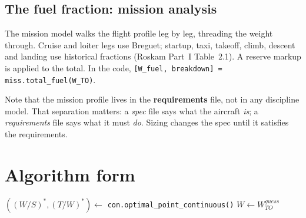 \documentclass[11pt, a4paper]{article}
\begin{document}
\subsection{The fuel fraction: mission analysis}

The mission model walks the flight profile leg by leg, threading the weight
through. Cruise and loiter legs use Breguet; startup, taxi, takeoff, climb,
descent and landing use historical fractions (Roskam Part~I Table~2.1). A
reserve markup is applied to the total. In the code,
\texttt{[W\_fuel, breakdown] = miss.total\_fuel(W\_TO)}.

Note that the mission profile lives in the \textbf{requirements} file, not in
any discipline model. That separation matters: a \emph{spec} file says what the
aircraft \emph{is}; a \emph{requirements} file says what it must \emph{do}.
Sizing changes the spec until it satisfies the requirements.

\section{Algorithm form}

\begin{algorithm}[H]
\SetAlgoLined
\DontPrintSemicolon
{}
$\left((W/S)^*, (T/W)^*\right) \leftarrow$ \texttt{con.optimal\_point\_continuous()}
$W \leftarrow W_{TO}^{guess}$\;
\caption{\texttt{SizingLoopL1} --- one state variable. [Martins slide 6]}
\end{algorithm}

\vspace{3mm}
\end{document}
